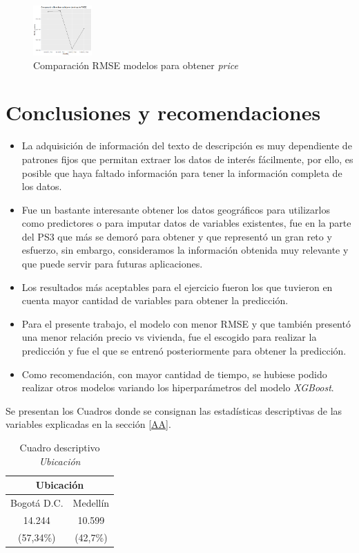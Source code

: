 \documentclass[conference, 10pt]{IEEEtran}
\begin{document}
\begin{figure}[htbp]
\centerline{\includegraphics[width=0.2\textwidth]{../Vistas/Comp_MSE_modelos_var_10.png}}
\caption{Comparación RMSE modelos para obtener \textit{price}}
\label{fig_3}
\end{figure}

\section{Conclusiones y recomendaciones}
\begin{itemize}
\item La adquisición de información del texto de descripción es muy dependiente de patrones fijos que permitan extraer los datos de interés fácilmente, por ello, es posible que haya faltado información para tener la información completa de los datos.
\item Fue un bastante interesante obtener los datos geográficos para utilizarlos como predictores o para imputar datos de variables existentes, fue en la parte del PS3 que más se demoró para obtener y que representó un gran reto y esfuerzo, sin embargo, consideramos la información obtenida muy relevante y que puede servir para futuras aplicaciones.
\item Los resultados más aceptables para el ejercicio fueron los que tuvieron en cuenta mayor cantidad de variables para obtener la predicción.
\item Para el presente trabajo, el modelo con menor RMSE y que también presentó una menor relación precio vs vivienda, fue el escogido para realizar la predicción y fue el que se entrenó posteriormente para obtener la predicción.
\item Como recomendación, con mayor cantidad de tiempo, se hubiese podido realizar otros modelos variando los hiperparámetros del modelo \textit{XGBoost}. 

\end{itemize}

Se presentan los Cuadros donde se consignan las estadísticas descriptivas de las variables explicadas en la sección \ref{AA}.\\ 
\begin{table}[htbp]
\caption{Cuadro descriptivo \textit{Ubicación}}
\begin{center}
\begin{tabular}{|c|c|}
\hline
\multicolumn{2}{|c|}{\textbf{Ubicación}} \\
\cline{1-2} 
\hline
 Bogotá D.C.&Medellín\\
 14.244&10.599\\
 (57,34\%)&(42,7\%)\\
 
	\hline
\end{tabular}
\label{tab_1}
\end{center}
\end{table}
\end{document}
